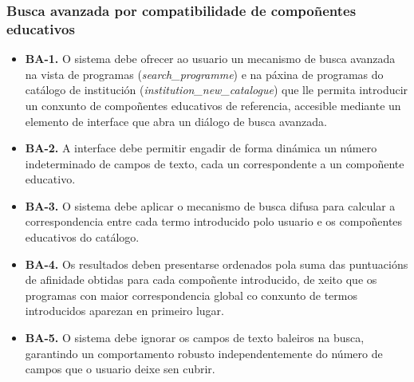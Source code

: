 \documentclass[%
    a4paper,               %
    twoside,               %
    10pt,                  %
]{article}                 %
\begin{document}
\subsubsection{Busca avanzada por compatibilidade de compoñentes educativos}
\label{req:sec:busca_avanzada}
\begin{itemize}
    \item \label{req:ba1}\textbf{BA-1.} O sistema debe ofrecer ao usuario un mecanismo de busca avanzada na vista de programas (\textit{search\_programme}) e na páxina de programas do catálogo de institución (\textit{institution\_new\_catalogue}) que lle permita introducir un conxunto de compoñentes educativos de referencia, accesible mediante un elemento de interface que abra un diálogo de busca avanzada.

    \item \label{req:ba2}\textbf{BA-2.} A interface debe permitir engadir de forma dinámica un número indeterminado de campos de texto, cada un correspondente a un compoñente educativo.

    \item \label{req:ba3}\textbf{BA-3.} O sistema debe aplicar o mecanismo de busca difusa para calcular a correspondencia entre cada termo introducido polo usuario e os compoñentes educativos do catálogo.

    \item \label{req:ba4}\textbf{BA-4.} Os resultados deben presentarse ordenados pola suma das puntuacións de afinidade obtidas para cada compoñente introducido, de xeito que os programas con maior correspondencia global co conxunto de termos introducidos aparezan en primeiro lugar.

    \item \label{req:ba5}\textbf{BA-5.} O sistema debe ignorar os campos de texto baleiros na busca, garantindo un comportamento robusto independentemente do número de campos que o usuario deixe sen cubrir.
\end{itemize}

\end{document}
